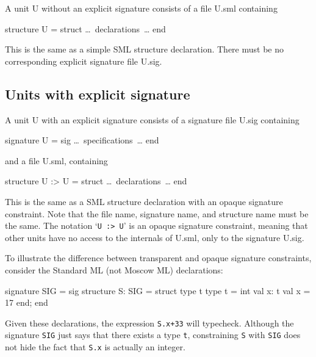 \documentclass[fleqn]{article}
\begin{document}
A unit U without an explicit signature consists of a file U.sml
containing 

\begin{program}
structure U = struct {\rm \ldots\ declarations\ \ldots} end
\end{program}

\noindent This is the same as a simple SML structure declaration.
There must be no corresponding explicit signature file U.sig.


\subsection{Units with explicit signature}
\label{sec-units-with}

A unit U with an explicit signature consists of a signature file
U.sig containing

\begin{program}
signature U = sig {\rm \ldots\ specifications\ \ldots} end
\end{program}

\noindent and a file U.sml, containing

\begin{program}
structure U :> U = struct {\rm \ldots\ declarations\ \ldots} end
\end{program}

\noindent This is the same as a SML structure declaration with an
opaque signature constraint.  Note that the file name, signature name,
and structure name must be the same.  The notation `{\tt U :> U}' is
an opaque signature constraint, meaning that other units have no
access to the internals of U.sml, only to the signature U.sig.

To illustrate the difference between transparent and opaque signature
constraints, consider the Standard ML (not Moscow ML) declarations:

\begin{program}
signature SIG = sig                     structure S: SIG = struct
    type t                                  type t = int   
    val x: t                                val x = 17     
end;                                    end                             
\end{program}

\noindent Given these declarations, the expression {\tt S.x+33} will
typecheck.  Although the signature {\tt SIG} just says that there
exists a type {\tt t}, constraining {\tt S} with {\tt SIG} does not
hide the fact that {\tt S.x} is actually an integer.
\end{document}
